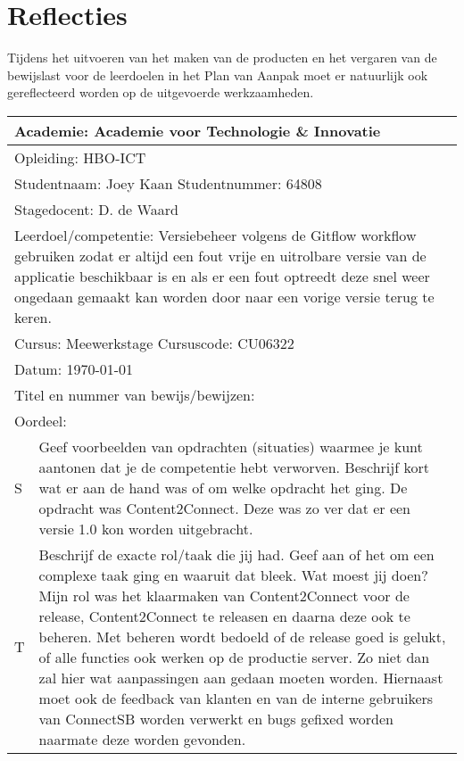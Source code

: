 \section{Reflecties}
Tijdens het uitvoeren van het maken van de producten en het vergaren van de bewijslast voor de leerdoelen in het Plan van Aanpak moet er natuurlijk ook gereflecteerd worden op de uitgevoerde werkzaamheden.

\begin{tabularx}{\textwidth}{| X | X |}
\hline
\multicolumn{2}{|l|}{Academie: Academie voor Technologie \& Innovatie } \\ 
\hline
\multicolumn{2}{|l|}{Opleiding: HBO-ICT } \\ 
\hline
\multicolumn{2}{|l|}{Studentnaam: Joey Kaan \hspace{35pt} Studentnummer: 64808} \\
\hline
\multicolumn{2}{|l|}{Stagedocent: D. de Waard} \\ 
\hline
\multicolumn{2}{|l|}{Leerdoel/competentie: Versiebeheer volgens de Gitflow workflow gebruiken zodat er
altijd een fout vrije en uitrolbare versie van de applicatie beschikbaar is en als
er een fout optreedt deze snel weer ongedaan gemaakt kan worden door naar
een vorige versie terug te keren.} \\
\hline
\multicolumn{2}{|l|}{Cursus: Meewerkstage \hspace{35pt} Cursuscode: CU06322} \\
\hline
\multicolumn{2}{|l|}{Datum: \today} \\
\hline
\multicolumn{2}{|l|}{Titel en nummer van bewijs/bewijzen: } \\ [50pt]
\hline
\multicolumn{2}{|l|}{Oordeel: } \\
\hline
S & Geef voorbeelden van opdrachten (situaties) waarmee je kunt aantonen dat je de competentie hebt verworven. Beschrijf kort wat er aan de hand was of om welke opdracht het ging. 
\newline
De opdracht was Content2Connect. Deze was zo ver dat er een versie 1.0 kon worden uitgebracht. \\ 
\hline
T & Beschrijf de exacte rol/taak die jij had. Geef aan of het om een complexe taak ging en waaruit dat bleek. Wat moest jij doen?
\newline
Mijn rol was het klaarmaken van Content2Connect voor de release, Content2Connect te releasen en daarna deze ook te beheren. Met beheren wordt bedoeld of de release goed is gelukt, of alle functies ook werken op de productie server. Zo niet dan zal hier wat aanpassingen aan gedaan moeten worden. Hiernaast moet ook de feedback van klanten en van de interne gebruikers van ConnectSB worden verwerkt en bugs gefixed worden naarmate deze worden gevonden.

\end{tabularx}
